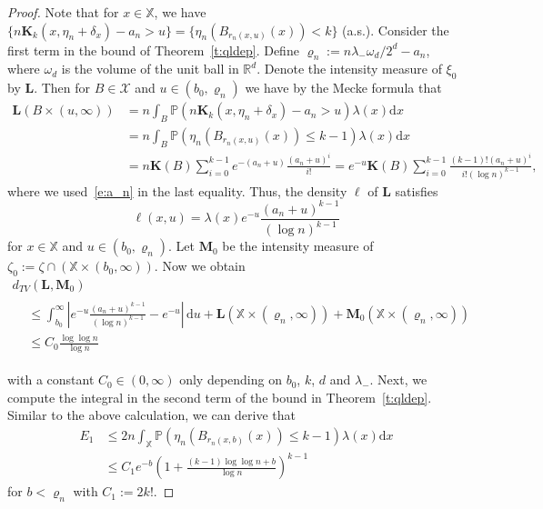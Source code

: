 \documentclass[AHL,Unicode,longabstracts]{cedram}
\newcommand*\bL{\mathbf{L}}
\newcommand*\bM{\mathbf{M}}
\newcommand*\bK{\mathbf{K}}
\newcommand*\R{\mathbb{R}}
\renewcommand*\P{\mathbb{P}}
\newcommand*\X{\mathbb{X}}
\newcommand*\cX{\mathcal{X}}
\newcommand*\md{\mathrm{d}}
\newcommand{\param}[1]{\left(#1\right)}
\newcommand{\prob}[1]{\P\left(#1\right)}
\begin{document}
\begin{proof}
Note that for $x\in\X$, we have $\{n\bK_k(x,\eta_n+\delta_x) - a_n >u \} = \{ \eta_n(B_{r_n(x,u)}(x)) < k \}$ ({a.s.}). Consider the first term in the bound of Theorem~\ref{t:qldep}. Define $\varrho_n:=n\lambda_- \omega_d/2^d - a_n$, where $\omega_d$ is the volume of the unit ball in $\R^d$. Denote the intensity measure of $\xi_0$ by $\bL$. Then for $B \in \cX$ and $u \in (b_0,\varrho_n)$ we have by the Mecke formula that
\begin{align*}
\bL\left(B \times (u,\infty)\right) &= n \int_{B} \prob{n\bK_k\left(x,\eta_n + \delta_x\right) - a_n > u} \lambda(x) \md x \\
& = n \int_{B} \prob{\eta_n\left(B_{r_n(x,u)}(x)\right) \leq k-1} \lambda(x) \md x \\
& = n \bK(B) \sum_{i=0}^{k-1}e^{-(a_n+u)}\frac{(a_n+u)^i}{i!} = e^{-u} \bK(B) \sum_{i=0}^{k-1} \frac{(k-1)!(a_n+u)^i}{ i! (\log n)^{k-1}},
\end{align*}
where we used~\eqref{e:a_n} in the last equality. Thus, the density $\ell$ of $\bL$ satisfies
\[
\ell(x,u) = \lambda(x) e^{-u} \frac{(a_n+u)^{k-1}}{(\log n)^{k-1}}
\]
for $x\in\X$ and $u\in(b_0,\varrho_n)$. Let $\bM_0$ be the intensity measure of $\zeta_0 := \zeta \cap (\X \times (b_0,\infty))$. Now we obtain
\begin{multline}\label{e:knngt1}
d_{TV}\left(\bL,\bM_0\right)\\
\begin{aligned}
&\leq \int_{{b_0}}^{\infty} \left| e^{-u} \frac{(a_n+u)^{k-1}}{(\log n)^{k-1}} -e^{-u} \right| \, \md u + \bL\left(\X\times \left(\varrho_n,\infty\right)\right) +\bM_0\left(\X\times \left(\varrho_n,\infty\right)\right) \\
&\leq C_0\frac{\log \log n}{\log n}
\end{aligned}
\end{multline}

\noindent with a constant $C_0\in(0,\infty)$ only depending on $b_0$, $k$, $d$ and $\lambda_-$. Next, we compute the integral in the second term of the bound in Theorem~\ref{t:qldep}. Similar to the above calculation, we can derive that
\begin{equation}\label{e:knngt2}
\begin{split}
E_1 & \leq {2} n \int_{\X} \prob{\eta_n\left(B_{r_n(x,b)}(x)\right) \leq k-1} \lambda(x) \md x \\
&\leq C_1 e^{-b}\param{1 + \frac{(k-1) \log \log n +b}{\log n}}^{k-1}
\end{split}
\end{equation}
for $b<\varrho_n$ with $C_1:=2 k!$.


\end{proof}
\end{document}
